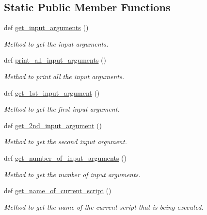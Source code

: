 \subsection*{Static Public Member Functions}
\begin{DoxyCompactItemize}
\item 
def \hyperlink{classutilities_1_1queue__ip__arguments_1_1queue__ip__args_abeea0f35fe270bfe53f359fd8e85c3e0}{get\+\_\+input\+\_\+arguments} ()
\begin{DoxyCompactList}\small\item\em Method to get the input arguments. \end{DoxyCompactList}\item 
def \hyperlink{classutilities_1_1queue__ip__arguments_1_1queue__ip__args_a85480b443e2538123e8531852f9035c9}{print\+\_\+all\+\_\+input\+\_\+arguments} ()
\begin{DoxyCompactList}\small\item\em Method to print all the input arguments. \end{DoxyCompactList}\item 
def \hyperlink{classutilities_1_1queue__ip__arguments_1_1queue__ip__args_a7b3c5efad539fadfb53eda0cfb8d3f03}{get\+\_\+1st\+\_\+input\+\_\+argument} ()
\begin{DoxyCompactList}\small\item\em Method to get the first input argument. \end{DoxyCompactList}\item 
def \hyperlink{classutilities_1_1queue__ip__arguments_1_1queue__ip__args_a18e59da1e2c8044e79ca32a5455ef40b}{get\+\_\+2nd\+\_\+input\+\_\+argument} ()
\begin{DoxyCompactList}\small\item\em Method to get the second input argument. \end{DoxyCompactList}\item 
def \hyperlink{classutilities_1_1queue__ip__arguments_1_1queue__ip__args_ab95a4242fd55bf5d126b35a5f5172593}{get\+\_\+number\+\_\+of\+\_\+input\+\_\+arguments} ()
\begin{DoxyCompactList}\small\item\em Method to get the number of input arguments. \end{DoxyCompactList}\item 
def \hyperlink{classutilities_1_1queue__ip__arguments_1_1queue__ip__args_a9eb36bdd493a2c866460b4d9fb24b68c}{get\+\_\+name\+\_\+of\+\_\+current\+\_\+script} ()
\begin{DoxyCompactList}\small\item\em Method to get the name of the current script that is being executed. \end{DoxyCompactList}\item 

\end{DoxyCompactItemize}
